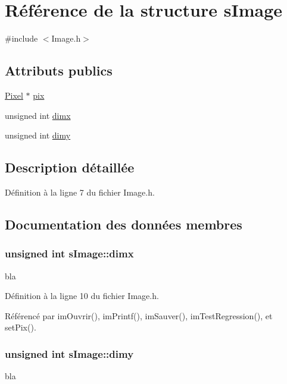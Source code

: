 \hypertarget{structs_image}{
\section{Référence de la structure sImage}
\label{structs_image}
}


{\ttfamily \#include $<$Image.h$>$}

\subsection*{Attributs publics}
\begin{DoxyCompactItemize}
\item 
\hyperlink{structs_pixel}{Pixel} $\ast$ \hyperlink{structs_image_a6951df3303ff6144e7786fe41b056082}{pix}
\item 
unsigned int \hyperlink{structs_image_aea33ee93ae081a6a1b8001866af0be0c}{dimx}
\item 
unsigned int \hyperlink{structs_image_aad6bdf6588fcbc3b4c03dd4f9da59b4d}{dimy}
\end{DoxyCompactItemize}


\subsection{Description détaillée}


Définition à la ligne 7 du fichier Image.h.



\subsection{Documentation des données membres}
\hypertarget{structs_image_aea33ee93ae081a6a1b8001866af0be0c}{
\subsubsection[{dimx}]{\setlength{\rightskip}{0pt plus 5cm}unsigned int {\bf sImage::dimx}}}
\label{structs_image_aea33ee93ae081a6a1b8001866af0be0c}
bla 

Définition à la ligne 10 du fichier Image.h.



Référencé par imOuvrir(), imPrintf(), imSauver(), imTestRegression(), et setPix().

\hypertarget{structs_image_aad6bdf6588fcbc3b4c03dd4f9da59b4d}{
\subsubsection[{dimy}]{\setlength{\rightskip}{0pt plus 5cm}unsigned int {\bf sImage::dimy}}}
\label{structs_image_aad6bdf6588fcbc3b4c03dd4f9da59b4d}
bla 

